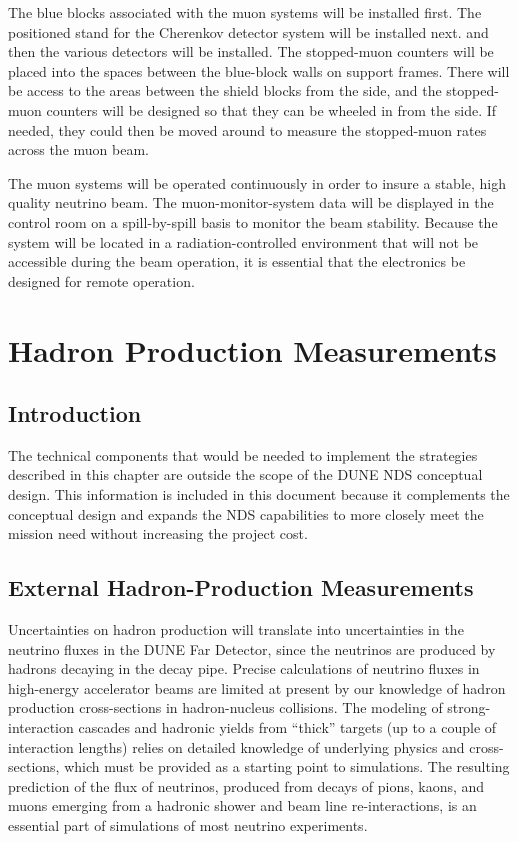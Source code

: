 The blue blocks associated with the muon systems will be installed first.
The positioned stand for the Cherenkov detector system will be installed next.
and then the various detectors will be installed.
The stopped-muon counters will be placed into the spaces between the blue-block walls on
support frames.   There will be access to the areas between the shield blocks 
from the side, and the stopped-muon counters will be designed so that they can 
be wheeled in from the side.  If needed, they could then be moved around to measure
the stopped-muon rates across the muon beam.

The muon systems will be operated continuously in order to insure a stable,
high quality neutrino beam.
The muon-monitor-system data will be displayed in the control room on
a spill-by-spill basis to monitor the beam stability. Because the
system will be located in a radiation-controlled environment that will
not be accessible during the beam operation, it is essential that the
electronics be designed for remote operation.

\section{Hadron Production Measurements}
\label{sec:detectors-nd-ref-hadron}

\subsection{Introduction}

The technical components that would be needed to implement the strategies 
described in this chapter are outside the scope of the DUNE NDS conceptual 
design. This information is included in this document because it complements the conceptual 
design and expands the NDS capabilities to more closely meet the mission need without increasing the project cost.

\subsection{External Hadron-Production Measurements}
\label{sec:detectors-nd-external-hadron}

Uncertainties on hadron production will translate into uncertainties in the neutrino fluxes
in the DUNE Far Detector, since the neutrinos are produced by hadrons decaying in the decay pipe. Precise calculations of neutrino fluxes in high-energy accelerator beams are limited
at present by our knowledge of hadron production cross-sections in hadron-nucleus collisions. 
The modeling of strong-interaction cascades and hadronic yields from ``thick'' targets
(up to a couple of interaction lengths) relies on detailed knowledge of underlying physics
and cross-sections, which must be provided as a starting point to simulations. The resulting 
prediction of the flux of neutrinos, produced from decays of pions, kaons, and muons
emerging from a hadronic shower and beam line re-interactions, is an essential part
of simulations of most neutrino experiments. 

